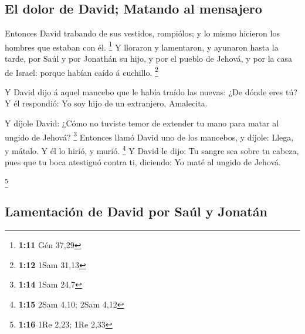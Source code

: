 \hypertarget{el-dolor-de-david-matando-al-mensajero}{%
\subsection{El dolor de David; Matando al
mensajero}\label{el-dolor-de-david-matando-al-mensajero}}

 Entonces David trabando de sus vestidos, rompiólos; y lo
mismo hicieron los hombres que estaban con él. \footnote{\textbf{1:11}
  Gén 37,29}  Y lloraron y lamentaron, y ayunaron hasta la
tarde, por Saúl y por Jonathán su hijo, y por el pueblo de Jehová, y por
la casa de Israel: porque habían caído á cuchillo. \footnote{\textbf{1:12}
  1Sam 31,13}

 Y David dijo á aquel mancebo que le había traído las
nuevas: ¿De dónde eres tú? Y él respondió: Yo soy hijo de un extranjero,
Amalecita.

 Y díjole David: ¿Cómo no tuviste temor de extender tu mano
para matar al ungido de Jehová? \footnote{\textbf{1:14} 1Sam 24,7}
 Entonces llamó David uno de los mancebos, y díjole: Llega,
y mátalo. Y él lo hirió, y murió. \footnote{\textbf{1:15} 2Sam 4,10;
  2Sam 4,12}  Y David le dijo: Tu sangre sea sobre tu
cabeza, pues que tu boca atestiguó contra ti, diciendo: Yo maté al
ungido de Jehová.

\footnote{\textbf{1:16} 1Re 2,23; 1Re 2,33}

\hypertarget{lamentaciuxf3n-de-david-por-sauxfal-y-jonatuxe1n}{%
\subsection{Lamentación de David por Saúl y
Jonatán}\label{lamentaciuxf3n-de-david-por-sauxfal-y-jonatuxe1n}}

